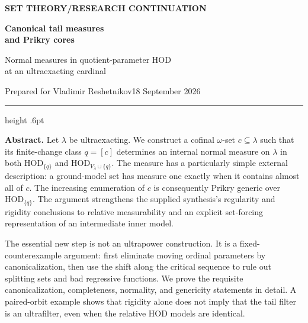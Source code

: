 \documentclass[11pt,letterpaper]{article}
\theoremstyle{definition}
\numberwithin{equation}{section}
\newcommand{\HOD}{\mathrm{HOD}}
\begin{document}
\thispagestyle{empty}
{\sffamily\bfseries\small\color{Olive}SET THEORY\quad /\quad RESEARCH CONTINUATION}

\vspace{13pt}
{\fontsize{28}{31}\selectfont\bfseries\color{Forest}Canonical tail measures\\ and Prikry cores\par}
\vspace{10pt}
{\fontsize{14}{18}\selectfont Normal measures in quotient-parameter HOD\\ at an ultraexacting cardinal\par}
\vspace{14pt}
{\color{Muted}Prepared for Vladimir Reshetnikov\hfill 18 September 2026\par}
\vspace{3pt}
{\color{Sage}\hrule height .6pt}
\vspace{12pt}

\textbf{Abstract.}
Let $\lambda$ be ultraexacting. We construct a cofinal $\omega$-set $c\subseteq\lambda$ such that its finite-change class $q=[c]$ determines an internal normal measure on $\lambda$ in both $\HOD_{\{q\}}$ and $\HOD_{V_\lambda\cup\{q\}}$. The measure has a particularly simple external description: a ground-model set has measure one exactly when it contains almost all of $c$. The increasing enumeration of $c$ is consequently Prikry generic over $\HOD_{\{q\}}$. The argument strengthens the supplied synthesis's regularity and rigidity conclusions to relative measurability and an explicit set-forcing representation of an intermediate inner model.

The essential new step is not an ultrapower construction. It is a fixed-counterexample argument: first eliminate moving ordinal parameters by canonicalization, then use the shift along the critical sequence to rule out splitting sets and bad regressive functions. We prove the requisite canonicalization, completeness, normality, and genericity statements in detail. A paired-orbit example shows that rigidity alone does not imply that the tail filter is an ultrafilter, even when the relative HOD models are identical.
\end{document}
